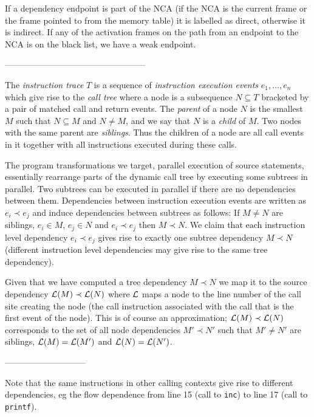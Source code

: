 If a dependency endpoint is part of the NCA (if the NCA is the current
frame or the frame pointed to from the memory table) it is labelled as
direct, otherwise it is indirect. If any of the activation frames on
the path from an endpoint to the NCA is on the black list, we have a
weak endpoint.

--------------------------------------------------



The {\em instruction trace} $T$ is a sequence of {\em instruction execution 
events} $e_1, \ldots, e_n$ which give rise to the {\em call tree} where a 
node is a subsequence $N \subseteq T$ bracketed by a pair of matched call 
and return events. The {\em parent} of a node $N$ is the smallest $M$ such
that $N \subseteq M$ and $N \not= M$, and we say that $N$ is a {\em child} 
of $M$. Two nodes with the same parent are {\em siblings}.
Thus the children of a node are all call events in it together 
with all instructions executed during these calls.

The program transformations we target, parallel execution of source statements,
essentially rearrange parts of the dynamic call tree by executing some subtrees 
in parallel. Two subtrees can be executed in parallel
if there are no dependencies between them. 
Dependencies between instruction execution events are written as $e_i \prec e_j$
and induce dependencies between subtrees as follows: If $M \not= N$ are 
siblings, $e_i \in M$, $e_j \in N$ and $e_i \prec e_j$ then $M \prec N$.
We claim that each instruction level dependency $e_i \prec e_j$ gives rise to 
exactly one subtree dependency $M \prec N$ (different instruction level 
dependencies may give rise to the same tree dependency).

\newcommand{\li}{{\cal L}}
Given that we have computed a tree dependency $M \prec N$ we map it to
the source dependency $\li(M) \prec \li(N)$ where $\li$ maps a node to the
line number of the call site creating the node (the call instruction associated 
with the call that is the first event of the node). This is of course an
approximation; $\li(M) \prec \li(N)$ corresponds to the set of all node
dependencies $M' \prec N'$ such that $M' \not= N'$ are siblings, $\li(M)=\li(M')$
and $\li(N)=\li(N')$.


-----------------------------

Note that the same instructions in other calling contexts give rise to 
different dependencies, eg the flow dependence from line 15 (call to {\tt inc})
to line 17 (call to {\tt printf}).

